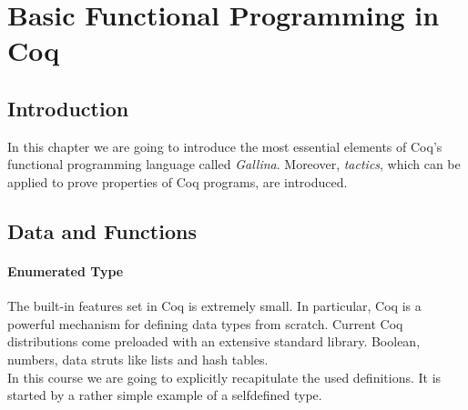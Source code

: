\section{Basic Functional Programming in Coq}

	\subsection{Introduction}

	In this chapter we are going to introduce the most essential elements of Coq's functional programming language called {\itshape  Gallina}. 
	Moreover, {\itshape tactics}, which can be applied to prove properties of Coq programs, are introduced.
	
	\subsection{Data and Functions}
	\label{subSec:DataAndFuctions}
	
	 \paragraph{Enumerated Type}
	 
	 
	  The built-in features set in Coq is extremely small. In particular, Coq is a powerful mechanism for defining data types from scratch.
	  Current Coq distributions come preloaded with an extensive standard library.
	  Boolean, numbers, data struts like lists and hash tables.\\
	  
	  In this course we are going to explicitly recapitulate the used definitions. 
	  It is started by a rather simple example of a selfdefined type.  
	   
